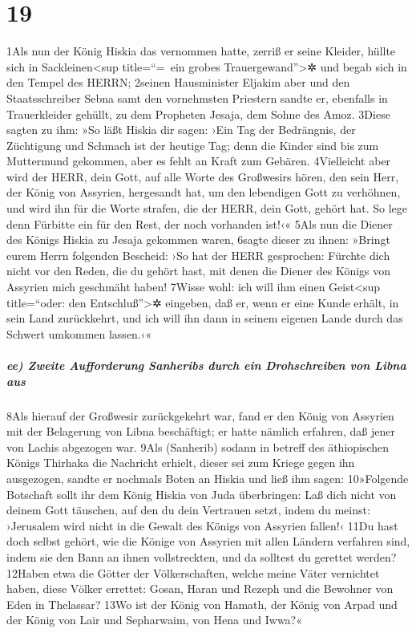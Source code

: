 \hypertarget{section-18}{%
\section{19}\label{section-18}}

1Als nun der König Hiskia das vernommen hatte, zerriß er seine Kleider,
hüllte sich in Sackleinen\textless sup title=``=~ein grobes
Trauergewand''\textgreater✲ und begab sich in den Tempel des HERRN;
2seinen Hausminister Eljakim aber und den Staatsschreiber Sebna samt den
vornehmsten Priestern sandte er, ebenfalls in Trauerkleider gehüllt, zu
dem Propheten Jesaja, dem Sohne des Amoz. 3Diese sagten zu ihm: »So läßt
Hiskia dir sagen: ›Ein Tag der Bedrängnis, der Züchtigung und Schmach
ist der heutige Tag; denn die Kinder sind bis zum Muttermund gekommen,
aber es fehlt an Kraft zum Gebären. 4Vielleicht aber wird der HERR, dein
Gott, auf alle Worte des Großwesirs hören, den sein Herr, der König von
Assyrien, hergesandt hat, um den lebendigen Gott zu verhöhnen, und wird
ihn für die Worte strafen, die der HERR, dein Gott, gehört hat. So lege
denn Fürbitte ein für den Rest, der noch vorhanden ist!‹« 5Als nun die
Diener des Königs Hiskia zu Jesaja gekommen waren, 6sagte dieser zu
ihnen: »Bringt eurem Herrn folgenden Bescheid: ›So hat der HERR
gesprochen: Fürchte dich nicht vor den Reden, die du gehört hast, mit
denen die Diener des Königs von Assyrien mich geschmäht haben! 7Wisse
wohl: ich will ihm einen Geist\textless sup title=``oder: den
Entschluß''\textgreater✲ eingeben, daß er, wenn er eine Kunde erhält, in
sein Land zurückkehrt, und ich will ihn dann in seinem eigenen Lande
durch das Schwert umkommen lassen.‹«

\hypertarget{ee-zweite-aufforderung-sanheribs-durch-ein-drohschreiben-von-libna-aus}{%
\subparagraph{ee) Zweite Aufforderung Sanheribs durch ein Drohschreiben
von Libna
aus}\label{ee-zweite-aufforderung-sanheribs-durch-ein-drohschreiben-von-libna-aus}}

8Als hierauf der Großwesir zurückgekehrt war, fand er den König von
Assyrien mit der Belagerung von Libna beschäftigt; er hatte nämlich
erfahren, daß jener von Lachis abgezogen war. 9Als (Sanherib) sodann in
betreff des äthiopischen Königs Thirhaka die Nachricht erhielt, dieser
sei zum Kriege gegen ihn ausgezogen, sandte er nochmals Boten an Hiskia
und ließ ihm sagen: 10»Folgende Botschaft sollt ihr dem König Hiskia von
Juda überbringen: Laß dich nicht von deinem Gott täuschen, auf den du
dein Vertrauen setzt, indem du meinst: ›Jerusalem wird nicht in die
Gewalt des Königs von Assyrien fallen!‹ 11Du hast doch selbst gehört,
wie die Könige von Assyrien mit allen Ländern verfahren sind, indem sie
den Bann an ihnen vollstreckten, und da solltest du gerettet werden?
12Haben etwa die Götter der Völkerschaften, welche meine Väter
vernichtet haben, diese Völker errettet: Gosan, Haran und Rezeph und die
Bewohner von Eden in Thelassar? 13Wo ist der König von Hamath, der König
von Arpad und der König von Lair und Sepharwaim, von Hena und Iwwa?«

